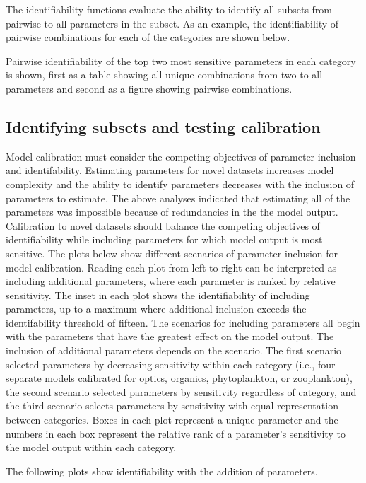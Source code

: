 \documentclass[letterpaper,12pt,oneside]{article}\usepackage[]{graphicx}\usepackage[]{color}
\begin{document}
The identifiability functions evaluate the ability to identify all subsets from pairwise to all parameters in the subset.  As an example, the identifiability of pairwise combinations for each of the categories are shown below.



Pairwise identifiability of the top two most sensitive parameters in each category is shown, first as a table showing all unique combinations from two to all parameters and second as a figure showing pairwise combinations.

\subsection{Identifying subsets and testing calibration}

Model calibration must consider the competing objectives of parameter inclusion and identifability.  Estimating parameters for novel datasets increases model complexity and the ability to identify parameters decreases with the inclusion of parameters to estimate.  The above analyses indicated that estimating all of the parameters was impossible because of redundancies in the the model output.  Calibration to novel datasets should balance the competing objectives of identifiability while including parameters for which model output is most sensitive.  The plots below show different scenarios of parameter inclusion for model calibration.  Reading each plot from left to right can be interpreted as including additional parameters, where each parameter is ranked by relative sensitivity.  The inset in each plot shows the identifiability of including parameters, up to a maximum where additional inclusion exceeds the identifability threshold of fifteen.  The scenarios for including parameters all begin with the parameters that have the greatest effect on the model output.  The inclusion of additional parameters depends on the scenario.  The first scenario selected parameters by decreasing sensitivity within each category (i.e., four separate models calibrated for optics, organics, phytoplankton, or zooplankton), the second scenario selected parameters by sensitivity regardless of category, and the third scenario selects parameters by sensitivity with equal representation between categories.  Boxes in each plot represent a unique parameter and the numbers in each box represent the relative rank of a parameter's sensitivity to the model output within each category. 

The following plots show identifiability with the addition of parameters. 
\end{document}
